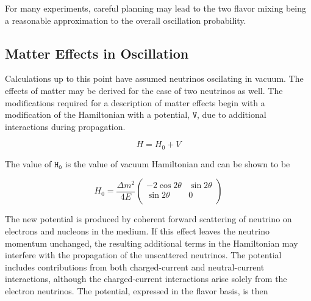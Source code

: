For many experiments, careful planning may lead to the two flavor mixing being a reasonable approximation to the overall oscillation probability.

\label{subsec:msw}
\subsection{Matter Effects in Oscillation}
Calculations up to this point have assumed neutrinos oscilating in vacuum.
The effects of matter may be derived for the case of two neutrinos as well.
The modifications required for a description of matter effects begin with a modification of the Hamiltonian with a potential, $\mathtt{V}$, due to additional interactions during propagation.

\begin{equation}
H = H_0 + V
\end{equation}

The value of $\mathtt{H_0}$ is the value of vacuum Hamiltonian and can be shown \cite{Review-PMNS} to be

\begin{equation}
H_0 = \frac{\Delta m^2}{4E} 
\begin{pmatrix}
- 2 \cos 2\theta & \sin 2\theta \\
\sin 2\theta & 0 \\
\end{pmatrix}
\end{equation}

The new potential is produced by coherent forward scattering of neutrino on electrons and nucleons in the medium.
If this effect leaves the neutrino momentum unchanged, the resulting additional terms in the Hamiltonian may interfere with the propagation of the unscattered neutrinos.
The potential includes contributions from both charged-current and neutral-current interactions, although the charged-current interactions arise solely from the electron neutrinos.
The potential, expressed in the flavor basis, is then




